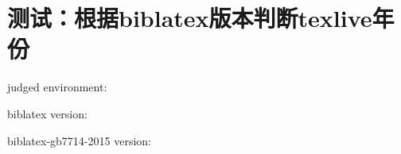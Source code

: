 \section{测试：根据biblatex版本判断texlive年份}

judged environment:

biblatex version: \versionofbiblatex

biblatex-gb7714-2015 version: \versionofgbtstyle
